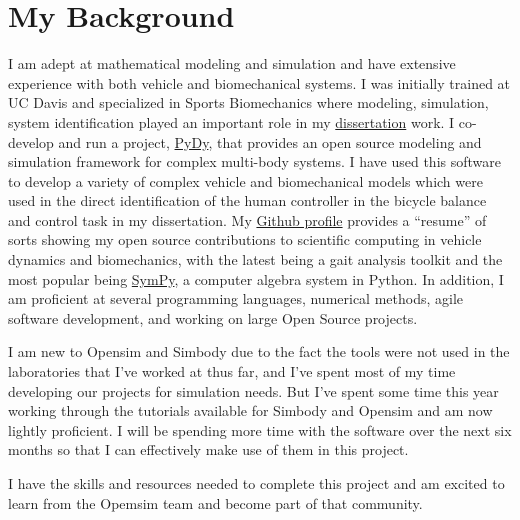 \documentclass[11pt,twocolumn]{article}
\begin{document}
\section*{My Background}

I am adept at mathematical modeling and simulation and have extensive
experience with both vehicle and biomechanical systems. I was initially trained
at UC Davis and specialized in Sports Biomechanics where modeling, simulation,
system identification played an important role in my
\href{http://moorepants.github.io/dissertation}{dissertation} work. I
co-develop and run a project, \href{http://pydy.org}{PyDy}, that provides an
open source modeling and simulation framework for complex multi-body systems.
I have used this software to develop a variety of complex vehicle and
biomechanical models which were used in the direct identification of the human
controller in the bicycle balance and control task in my dissertation. My
\href{http://github.com/moorepants}{Github profile} provides a ``resume'' of
sorts showing my open source contributions to scientific computing in vehicle
dynamics and biomechanics, with the latest being a gait analysis toolkit and
the most popular being \href{http://www.sympy.org}{SymPy}, a computer algebra
system in Python. In addition, I am proficient at several programming
languages, numerical methods, agile software development, and working on large
Open Source projects.

I am new to Opensim and Simbody due to the fact the tools were not used in the
laboratories that I've worked at thus far, and I've spent most of my time
developing our projects for simulation needs. But I've spent some time this
year working through the tutorials available for Simbody and Opensim and am now
lightly proficient. I will be spending more time with the software over the
next six months so that I can effectively make use of them in this project.

I have the skills and resources needed to complete this project and am excited
to learn from the Opemsim team and become part of that community.



\end{document}
